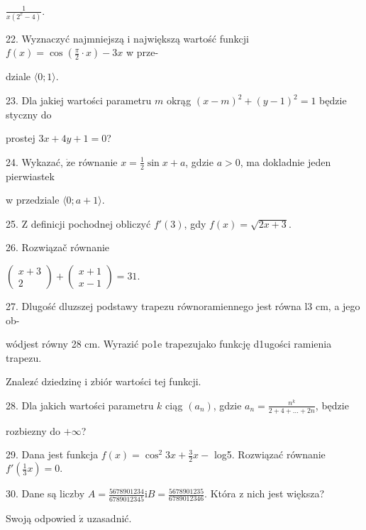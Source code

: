 \documentclass[a4paper,12pt]{article}
\begin{document}
$\displaystyle \frac{1}{x(2^{x}-4)}.$

22. Wyznaczyć najmniejszą i największą wartość funkcji $f(x)=\displaystyle \cos(\frac{\pi}{2}\cdot x)-3x$ w prze-

dziale $\langle 0;1\rangle.$

23. Dla jakiej wartości parametru $m$ okrąg $(x-m)^{2}+(y-1)^{2}=1$ będzie styczny do

prostej $3x+4y+1=0$?

24. Wykazać, $\dot{\mathrm{z}}\mathrm{e}$ równanie $x=\displaystyle \frac{1}{2}\sin x+a$, gdzie $a>0$, ma dokladnie jeden pierwiastek

w przedziale $\langle 0;a+1\rangle.$

25. $\mathrm{Z}$ definicji pochodnej obliczyć $f'(3)$, gdy $f(x)=\sqrt{2x+3}.$

26. Rozwiązač równanie

$\left(\begin{array}{l}
x+3\\
2
\end{array}\right)+\left(\begin{array}{l}
x+1\\
x-1
\end{array}\right)=31.$

27. Dlugość dluzszej podstawy trapezu równoramiennego jest równa l3 cm, a jego ob-

wódjest równy 28 cm. Wyrazić po1e trapezujako funkcję d1ugości ramienia trapezu.

Znalez$\acute{}$ć dziedzinę i zbiór wartości tej funkcji.

28. Dla jakich wartości parametru $k$ ciąg $(a_{n})$, gdzie $a_{n} = \displaystyle \frac{n^{k}}{2+4+\ldots+2n}$, będzie

rozbiezny do $+\infty$?

29. Dana jest funkcja $f(x)=\displaystyle \cos^{2}3x+\frac{3}{2}x-$ log5. Rozwiązać równanie $f'(\displaystyle \frac{1}{3}x)=0.$

30. Dane są liczby $A = \displaystyle \frac{5678901234}{6789012345} \mathrm{i} B = \displaystyle \frac{5678901235}{6789012346}$. Która z nich jest większa?

Swoją odpowied $\acute{\mathrm{z}}$ uzasadnić.
\end{document}
